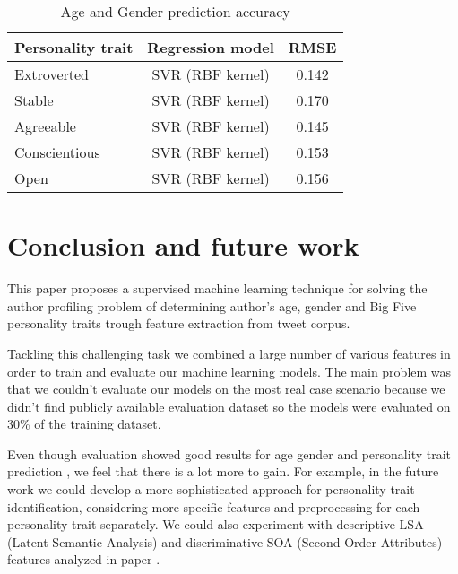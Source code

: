 \documentclass[10pt, a4paper]{article}
\begin{document}
\begin{table}[h]
\vspace{1mm}
\caption{Age and Gender prediction accuracy}
\label{tab:narrow-table-4}
\vspace{-6mm}
\begin{center}
\begin{tabular}{lcc}
\midrule
Personality trait & Regression model & RMSE\\
\midrule
 Extroverted & SVR  (RBF kernel) & 0.142 \\
 Stable & SVR (RBF kernel)& 0.170 \\
 Agreeable & SVR  (RBF kernel)& 0.145 \\
 Conscientious & SVR  (RBF kernel)  & 0.153 \\
 Open & SVR  (RBF kernel) & 0.156 \\
\bottomrule
\end{tabular}
\end{center}
\end{table}
\par

\section{Conclusion and future work}

This paper proposes a supervised machine learning technique for solving the author profiling problem of determining author's age, gender and Big Five personality traits trough feature extraction from tweet corpus. 
\par\vspace{1mm}
Tackling this challenging task we combined a large number of various features in order to train and evaluate our machine learning models. The main problem was that we couldn't evaluate our models on the most real case scenario because we didn't find publicly available evaluation dataset so the models were evaluated on 30\% of the training dataset.
\par\vspace{1mm}
Even though evaluation showed good results for age gender and personality trait prediction  \citep{rangel2015}, we feel that there is a lot more to gain. For example, in the future work we could develop a more sophisticated approach for personality trait identification, considering more specific features and preprocessing for each personality trait separately. We could also experiment with descriptive LSA (Latent Semantic Analysis) and discriminative SOA (Second Order Attributes) features analyzed in paper \citep{escalante2015}.


 
\end{document}

